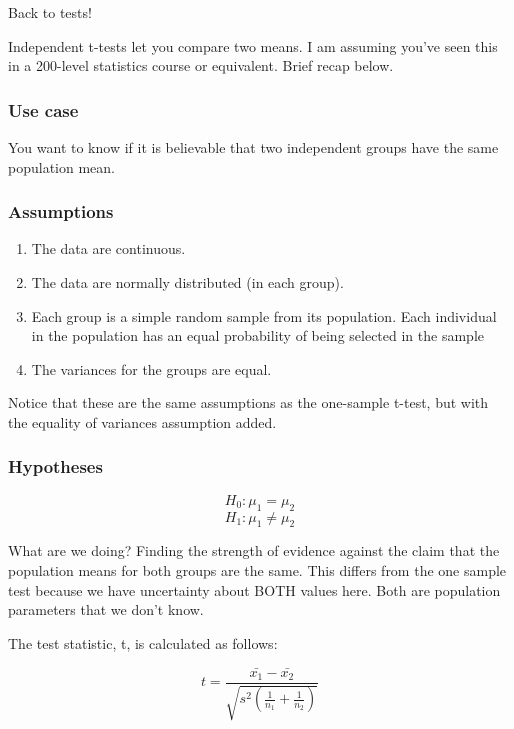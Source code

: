 \documentclass[
]{book}
\providecommand{\tightlist}{%
  \setlength{\itemsep}{0pt}\setlength{\parskip}{0pt}}
\begin{document}
Back to tests!

Independent t-tests let you compare two means. I am assuming you've seen this in a 200-level statistics course or equivalent. Brief recap below.

\hypertarget{use-case-1}{%
\subsubsection{Use case}\label{use-case-1}}

You want to know if it is believable that two independent groups have the same population mean.

\hypertarget{assumptions-1}{%
\subsubsection{Assumptions}\label{assumptions-1}}

\begin{enumerate}
\def\labelenumi{\arabic{enumi}.}
\tightlist
\item
  The data are continuous.
\item
  The data are normally distributed (in each group).
\item
  Each group is a simple random sample from its population. Each individual in the population has an equal probability of being selected in the sample
\item
  The variances for the groups are equal.
\end{enumerate}

Notice that these are the same assumptions as the one-sample t-test, but with the equality of variances assumption added.

\hypertarget{hypotheses-1}{%
\subsubsection{Hypotheses}\label{hypotheses-1}}

\[H_0: \mu_1 = \mu_2\]
\[H_1: \mu_1 \ne \mu_2\]

What are we doing? Finding the strength of evidence against the claim that the population means for both groups are the same. This differs from the one sample test because we have uncertainty about BOTH values here. Both are population parameters that we don't know.

The test statistic, t, is calculated as follows:

\[ t = \frac{\bar{x_1} - \bar{x_2}}{\sqrt{s^2(\frac{1}{n_1} + \frac{1}{n_2})}} \]
\end{document}
